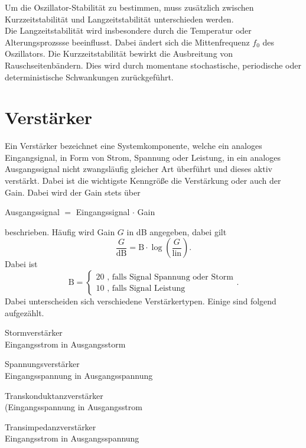 Um die Oszillator-Stabilität zu bestimmen, muss zusätzlich zwischen Kurzzeitstabilität und Langzeitstabilität unterschieden werden. \\
Die Langzeitstabilität wird insbesondere durch die Temperatur oder Alterungsprozssse beeinflusst. Dabei ändert sich die Mittenfrequenz $f_{0} $ des Oszillators. Die Kurzzeitstabilität bewirkt die Ausbreitung von Rauschseitenbändern. Dies wird durch momentane stochastische, periodische oder deterministische Schwankungen zurückgeführt\cite{HFKompo}.
\section{Verstärker}
Ein Verstärker bezeichnet eine Systemkomponente, welche ein  analoges Eingangsignal, in Form von Strom, Spannung oder Leistung, in ein analoges Ausgangssignal nicht zwangsläufig gleicher Art überführt und dieses aktiv verstärkt. Dabei ist die wichtigste Kenngröße die Verstärkung oder auch der Gain. Dabei wird der Gain stets über 
\begin{center}
Ausgangssignal $ = $ Eingangssignal $ \cdot $ Gain
\end{center}
beschrieben. Häufig wird Gain $G$ in dB angegeben, dabei gilt
\begin{equation}
\frac{G}{\text{dB}} = \text{B} \cdot \log \left( \frac{G}{\text{lin}} \right).
\end{equation}
Dabei ist 
\begin{equation}
\text{B} = \begin{cases} 20 \text{ , falls Signal Spannung oder Storm} \\ 10 \text{ , falls Signal Leistung} \end{cases}.
\end{equation}
Dabei unterscheiden sich verschiedene Verstärkertypen. Einige sind folgend aufgezählt.
\begin{description}
\item Stormverstärker \\
	  Eingangsstrom in Ausgangsstorm
\item Spannungsverstärker    		\\
	  Eingangsspannung in Ausgangsspannung
\item Transkonduktanzverstärker   \\
	  (Eingangsspannung  in Ausgangsstrom
\item Transimpedanzverstärker  	\\
Eingangsstrom  in Ausgangsspannung
\end{description}
